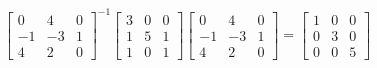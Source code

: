 \begin{Answer}
\begin{enumerate}[label=(\alph*)]
\begin{align*}
\begin{bmatrix}
0 & 4 & 0\\
-1 & -3 & 1\\
4 & 2 & 0
\end{bmatrix}^{-1}
\begin{bmatrix}
3 & 0 & 0\\
1 & 5 & 1\\
1 & 0 & 1
\end{bmatrix}
\begin{bmatrix}
0 & 4 & 0\\
-1 & -3 & 1\\
4 & 2 & 0
\end{bmatrix}
=
\begin{bmatrix}
1 & 0 & 0\\
0 & 3 & 0\\
0 & 0 & 5  
\end{bmatrix}
\end{align*}
\end{enumerate}
\end{Answer}

